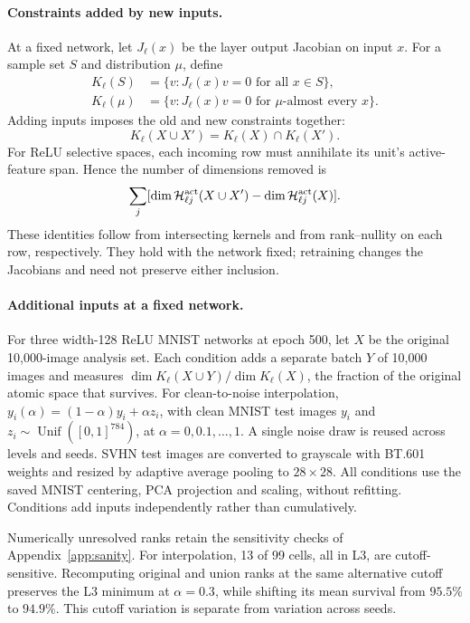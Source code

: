 \paragraph{Constraints added by new inputs.}
At a fixed network, let $J_\ell(x)$ be the layer output Jacobian on input $x$. For a sample set $S$ and distribution $\mu$, define
\begin{align*}
 K_\ell(S)&=\{v:J_\ell(x)v=0\text{ for all }x\in S\},\\
 K_\ell(\mu)&=\{v:J_\ell(x)v=0\text{ for }\mu\text{-almost every }x\}.
\end{align*}
Adding inputs imposes the old and new constraints together:
\[
 K_\ell(X\cup X')=K_\ell(X)\cap K_\ell(X').
\]
For ReLU selective spaces, each incoming row must annihilate its unit's active-feature span. Hence the number of dimensions removed is
\[
 \sum_j[\dim\mathcal H_{\ell j}^{\rm act}(X\cup X')-\dim\mathcal H_{\ell j}^{\rm act}(X)].
\]
These identities follow from intersecting kernels and from rank--nullity on each row, respectively. They hold with the network fixed; retraining changes the Jacobians and need not preserve either inclusion.

\paragraph{Additional inputs at a fixed network.}\label{app:methods-newinput}
For three width-128 ReLU MNIST networks at epoch 500, let $X$ be the original 10,000-image analysis set. Each condition adds a separate batch $Y$ of 10,000 images and measures $\dim K_\ell(X\cup Y)/\dim K_\ell(X)$, the fraction of the original atomic space that survives. For clean-to-noise interpolation, $y_i(\alpha)=(1-\alpha)y_i+\alpha z_i$, with clean MNIST test images $y_i$ and $z_i\sim\operatorname{Unif}([0,1]^{784})$, at $\alpha=0,0.1,\ldots,1$. A single noise draw is reused across levels and seeds. SVHN test images are converted to grayscale with BT.601 weights and resized by adaptive average pooling to $28\times28$. All conditions use the saved MNIST centering, PCA projection and scaling, without refitting. Conditions add inputs independently rather than cumulatively.

Numerically unresolved ranks retain the sensitivity checks of Appendix~\ref{app:sanity}. For interpolation, 13 of 99 cells, all in L3, are cutoff-sensitive. Recomputing original and union ranks at the same alternative cutoff preserves the L3 minimum at $\alpha=0.3$, while shifting its mean survival from $95.5\%$ to $94.9\%$. This cutoff variation is separate from variation across seeds.

